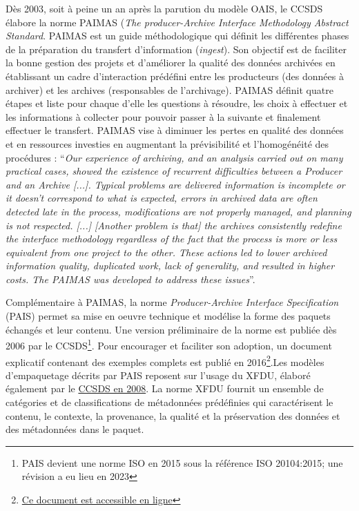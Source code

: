 \documentclass[12pt,a4paper]{article} %
\begin{document}
Dès 2003, soit à peine un an après la parution du modèle OAIS, le CCSDS élabore la norme PAIMAS (\textit{The producer-Archive Interface Methodology Abstract Standard}. PAIMAS est un guide méthodologique qui définit les différentes phases de la préparation du transfert d'information (\textit{ingest}). Son objectif est de faciliter la bonne gestion des projets et d'améliorer la qualité des données archivées en établissant un cadre d'interaction prédéfini entre les producteurs (des données à archiver) et les archives (responsables de l'archivage). PAIMAS définit quatre étapes et liste pour chaque d'elle les questions à résoudre, les choix à effectuer et les informations à collecter pour pouvoir passer à la suivante et finalement effectuer le transfert. PAIMAS vise à diminuer les pertes en qualité des données et en ressources investies en augmentant la prévisibilité et l'homogénéité des procédures : \enquote{\textit{Our experience of archiving, and an analysis carried out on many practical cases, showed the existence of recurrent difficulties between a Producer and an Archive [...]. Typical problems are delivered information is incomplete or it doesn't correspond to what is expected, errors in archived data are often detected late in the process, modifications are not properly managed, and planning is not respected. [...] [Another problem is that] the archives consistently redefine the interface methodology regardless of the fact that the process is more or less equivalent from one project to the other. These actions led to lower archived information quality, duplicated work, lack of generality, and resulted in higher costs. The PAIMAS was developed to address these issues}}\autocite{Garrett2004}.

Complémentaire à PAIMAS, la norme \textit{Producer-Archive Interface Specification} (PAIS) permet sa mise en oeuvre technique et modélise la forme des paquets échangés et leur contenu. Une version préliminaire de la norme est publiée dès 2006 par le CCSDS\footnote{PAIS devient une norme ISO en 2015 sous la référence ISO 20104:2015; une révision a eu lieu en 2023}. Pour encourager et faciliter son adoption, un document explicatif contenant des exemples complets est publié en 2016\footnote{\href{https://public.ccsds.org/Pubs/651x2g1.pdf}{Ce document est accessible en ligne}}.Les modèles d'empaquetage décrits par PAIS reposent sur l'usage du XFDU, élaboré également par le \href{https://public.ccsds.org/Pubs/661x0b1.pdf}{CCSDS en 2008}. La norme XFDU fournit un ensemble de catégories et de classifications de métadonnées prédéfinies qui caractérisent le contenu, le contexte, la provenance, la qualité et la préservation des données et des métadonnées dans le paquet.
\end{document}
